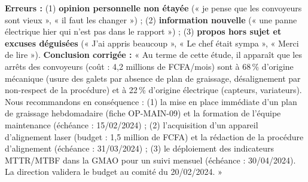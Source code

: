 \documentclass[11pt]{article}
\begin{document}
\begin{corrige}[Exercice 2]
\textbf{Erreurs :} (1) \textbf{opinion personnelle non étayée} (« je pense que les convoyeurs sont vieux », « il faut les changer ») ; (2) \textbf{information nouvelle} (« une panne électrique hier qui n'est pas dans le rapport ») ; (3) \textbf{propos hors sujet et excuses déguisées} (« J'ai appris beaucoup », « Le chef était sympa », « Merci de lire »).
\textbf{Conclusion corrigée :}
« Au terme de cette étude, il apparaît que les arrêts des convoyeurs (coût : 4,2 millions de FCFA/mois) sont à 68\,\% d'origine mécanique (usure des galets par absence de plan de graissage, désalignement par non-respect de la procédure) et à 22\,\% d'origine électrique (capteurs, variateurs).
Nous recommandons en conséquence : (1) la mise en place immédiate d'un plan de graissage hebdomadaire (fiche OP-MAIN-09) et la formation de l'équipe maintenance (échéance : 15/02/2024) ; (2) l'acquisition d'un appareil d'alignement laser (budget : 1,5 million de FCFA) et la rédaction de la procédure d'alignement (échéance : 31/03/2024) ; (3) le déploiement des indicateurs MTTR/MTBF dans la GMAO pour un suivi mensuel (échéance : 30/04/2024). La direction validera le budget au comité du 20/02/2024. »
\end{corrige}
\end{document}
